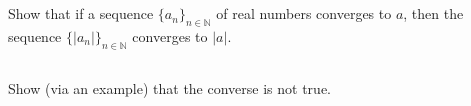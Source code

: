 \documentclass[11pt,letterpaper]{article}
\begin{document}
\newpage
\section{}
\subsection{} Show that if a sequence $\{a_n\}_{n\in\mathbb{N}}$ of real numbers converges to $a$, then the sequence $\{|a_n|\}_{n\in\mathbb{N}}$ converges to $|a|$. 
\subsection{} Show (via an example) that the converse is not true.


\vfill
\printbibliography
\end{document}
